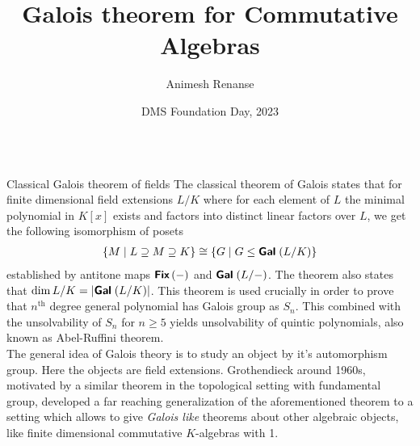 \documentclass[final,20pt]{beamer}
\title[]{\Huge Galois theorem for Commutative Algebras}
\author[]{\large Animesh Renanse}
\institute[]{\Large Department of Mathematics \& Statistics, IISER Kolkata}
\date{DMS Foundation Day, 2023}
\newcommand{\isomorph}{\cong}
\newcommand{\Gal}[1]{{\fontfamily{lmss}\selectfont 
		\text{\textbf{Gal}} \;#1
}}
\newcommand{\Fix}[1]{{\fontfamily{lmss}\selectfont 
		\text{\textbf{{Fix}}} \left (#1\right )
}}
\newcommand{\abs}[1]{\left \vert #1 \right \vert}
\begin{document}
	
	\begin{frame}
	
		\maketitle
		\begin{columns}[t]
		
			\begin{column}{.32\linewidth}
				
				
				\begin{block}{Classical Galois theorem of fields}
					The classical theorem of Galois states that for finite dimensional field extensions $L/K$ where for each element of $L$ the minimal polynomial in $K[x]$ exists and factors into distinct linear factors over $L$, we get the following isomorphism of posets
					\begin{align*}
						\{M\;\vert\; L\supseteq M\supseteq K\} \isomorph \{G\;\vert\;G\le \Gal (L/K) \}
					\end{align*}
				established by antitone maps $\Fix{-}$ and $\Gal(L/-)$. The theorem also states that $\dim L/K = \abs{\Gal{(L/K)}}$. This theorem is used crucially in order to prove that $n^{\text{th}}$ degree general polynomial has Galois group as $S_n$. This combined with the unsolvability of $S_n$ for $n\ge 5$ yields unsolvability of quintic polynomials, also known as Abel-Ruffini theorem.\\
				
				The general idea of Galois theory is to study an object by it's automorphism group. Here the objects are field extensions. Grothendieck around 1960s, motivated by a similar theorem in the topological setting with fundamental group, developed a far reaching generalization of the aforementioned theorem to a setting which allows to give \textit{Galois like} theorems about other algebraic objects, like finite dimensional commutative $K$-algebras with 1. 
				\end{block}
				

\end{column}
\end{columns}
\end{frame}
\end{document}
